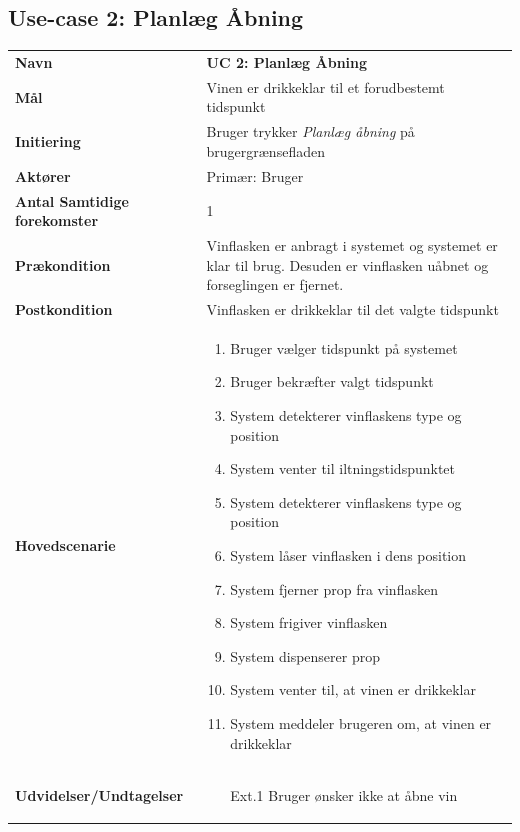 \subsection{Use-case 2: Planlæg Åbning}
\begin{longtable}{>{\bfseries}p{100pt} p{300pt}}
	
	Navn & \bfseries{UC 2: Planlæg Åbning} \\
	Mål & Vinen er drikkeklar til et forudbestemt tidspunkt\\
	Initiering & Bruger trykker \emph{Planlæg åbning} på brugergrænsefladen\\
	Aktører & Primær: Bruger \\
	Antal Samtidige forekomster & 1 \\
	Prækondition & Vinflasken er anbragt i systemet og systemet er klar til brug. Desuden er vinflasken uåbnet og forseglingen er fjernet. \\
	Postkondition & Vinflasken er drikkeklar til det valgte tidspunkt\\
	Hovedscenarie & \begin{enumerate}
		\item Bruger vælger tidspunkt på systemet
		\subitem [Ext. 1: Bruger ønsker ikke at åbne vin] 
		\item Bruger bekræfter valgt tidspunkt
		\subitem [Ext. 2: Vinen kan ikke iltes korrekt til det valgte tidspunkt]
		\item System detekterer vinflaskens type og position
		\subitem [Ext. 3: System registrerer ugyldig type af vinflaske]
		\subitem [Ext. 4: System kan ikke registrere en vinflaske]
		\item System venter til iltningstidspunktet
		\subitem [Ext. 5: Bruger annullerer planlagt åbning af vin]
		\item System detekterer vinflaskens type og position
		\subitem [Ext. 3: System registrerer ugyldig type af vinflaske]
		\subitem [Ext. 4: System kan ikke registrere en vinflaske]
		\item System låser vinflasken i dens position
		\item System fjerner prop fra vinflasken
		\item System frigiver vinflasken
		\item System dispenserer prop
		\item System venter til, at vinen er drikkeklar
		\item System meddeler brugeren om, at vinen er drikkeklar		
	\end{enumerate} \\
	Udvidelser/Undtagelser & 
	\begin{enumerate}
		\item[Ext.1] Bruger ønsker ikke at åbne vin
		

\end{enumerate}
\end{longtable}
